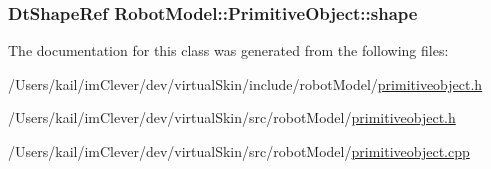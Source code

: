 \label{class_robot_model_1_1_primitive_object_a242ae58660af2bf8f7e3354f55486c47}
\hypertarget{class_robot_model_1_1_primitive_object_ac0e31de5b780652446fdaa06eeec47d6}{
\subsubsection[{shape}]{\setlength{\rightskip}{0pt plus 5cm}DtShapeRef {\bf RobotModel::PrimitiveObject::shape}}}
\label{class_robot_model_1_1_primitive_object_ac0e31de5b780652446fdaa06eeec47d6}


The documentation for this class was generated from the following files:\begin{DoxyCompactItemize}
\item 
/Users/kail/imClever/dev/virtualSkin/include/robotModel/\hyperlink{include_2robot_model_2primitiveobject_8h}{primitiveobject.h}\item 
/Users/kail/imClever/dev/virtualSkin/src/robotModel/\hyperlink{src_2robot_model_2primitiveobject_8h}{primitiveobject.h}\item 
/Users/kail/imClever/dev/virtualSkin/src/robotModel/\hyperlink{primitiveobject_8cpp}{primitiveobject.cpp}\end{DoxyCompactItemize}
